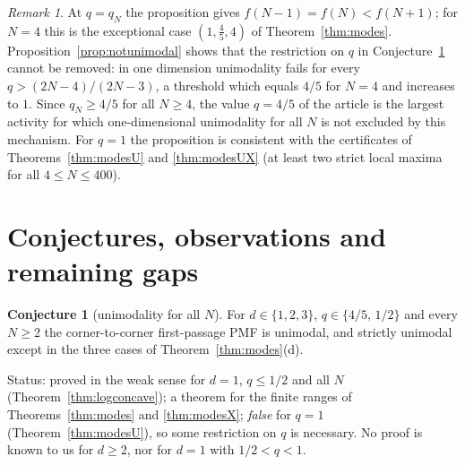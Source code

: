 \documentclass[11pt,a4paper]{article}
\theoremstyle{definition}
\newtheorem{conjecture}[theorem]{Conjecture}
\theoremstyle{remark}
\newtheorem{remark}[theorem]{Remark}
\begin{document}
\begin{remark}
At $q=q_N$ the proposition gives $f(N-1)=f(N)<f(N+1)$; for $N=4$ this is the exceptional case $(1,\frac45,4)$ of Theorem~\ref{thm:modes}. Proposition~\ref{prop:notunimodal} shows that the restriction on $q$ in Conjecture~\ref{conj:unimodal} cannot be removed: in one dimension unimodality fails for every $q>(2N-4)/(2N-3)$, a threshold which equals $4/5$ for $N=4$ and increases to $1$. Since $q_N\ge4/5$ for all $N\ge4$, the value $q=4/5$ of the article is the largest activity for which one-dimensional unimodality for all $N$ is not excluded by this mechanism. For $q=1$ the proposition is consistent with the certificates of Theorems~\ref{thm:modesU} and \ref{thm:modesUX} (at least two strict local maxima for all $4\le N\le400$).
\end{remark}




\section{Conjectures, observations and remaining gaps}\label{sec:gaps}

\begin{conjecture}[unimodality for all $N$]\label{conj:unimodal}
For $d\in\{1,2,3\}$, $q\in\{4/5,\,1/2\}$ and every $N\ge2$ the corner-to-corner first-passage PMF is unimodal, and strictly unimodal except in the three cases of Theorem~\ref{thm:modes}(d).
\end{conjecture}
Status: proved in the weak sense for $d=1$, $q\le1/2$ and all $N$ (Theorem~\ref{thm:logconcave}); a theorem for the finite ranges of Theorems~\ref{thm:modes} and \ref{thm:modesX}; \emph{false} for $q=1$ (Theorem~\ref{thm:modesU}), so some restriction on $q$ is necessary. No proof is known to us for $d\ge2$, nor for $d=1$ with $1/2<q<1$.
\end{document}
